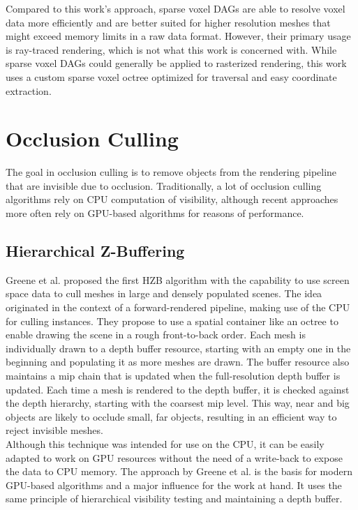 \noindent
Compared to this work's approach, sparse voxel \ac{DAG}s are able to resolve voxel data more efficiently and are 
better suited for higher resolution meshes that might exceed memory limits in a raw data format. However, their 
primary usage is ray-traced rendering, which is not what this work is concerned with. While sparse voxel \ac{DAG}s 
could generally be applied to rasterized rendering, this work uses a custom sparse voxel octree optimized for 
traversal and easy coordinate extraction. 


\section{Occlusion Culling}

The goal in occlusion culling is to remove objects from the rendering pipeline that are invisible due to 
occlusion. Traditionally, a lot of occlusion culling algorithms rely on \ac{CPU} computation of visibility, 
although recent approaches more often rely on \ac{GPU}-based algorithms for reasons of performance. 


\subsection*{Hierarchical Z-Buffering}

Greene et al. \cite{Greene93,Greene95} proposed the first \ac{HZB} algorithm with the capability to use screen space 
data to cull meshes in large and densely populated scenes. The idea originated in the context of a forward-rendered 
pipeline, making use of the \ac{CPU} for culling instances. They propose to use a spatial container like an octree to 
enable drawing the scene in a rough front-to-back order. Each mesh is individually drawn to a depth buffer resource, 
starting with an empty one in the beginning and populating it as more meshes are drawn. The buffer resource also 
maintains a mip chain that is updated when the full-resolution depth buffer is updated. Each time a mesh is rendered 
to the depth buffer, it is checked against the depth hierarchy, starting with the coarsest mip level. This way, near 
and big objects are likely to occlude small, far objects, resulting in an efficient way to reject invisible meshes.\\

\noindent
Although this technique was intended for use on the \ac{CPU}, it can be easily adapted to work on \ac{GPU} resources 
without the need of a write-back to expose the data to \ac{CPU} memory. The approach by Greene et al. is the basis for 
modern \ac{GPU}-based algorithms and a major influence for the work at hand. It uses the same principle of hierarchical 
visibility testing and maintaining a depth buffer. \\

